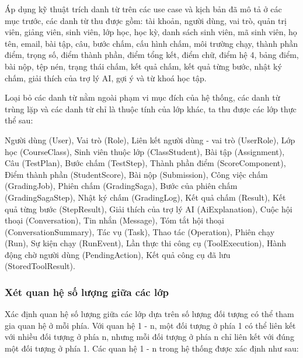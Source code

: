 \documentclass[../BTL.tex]{subfiles}
\begin{document}
Áp dụng kỹ thuật trích danh từ trên các use case và kịch bản đã mô tả ở các mục trước, các danh từ thu được gồm: tài khoản, người dùng, vai trò, quản trị viên, giảng viên, sinh viên, lớp học, học kỳ, danh sách sinh viên, mã sinh viên, họ tên, email, bài tập, câu, bước chấm, cấu hình chấm, môi trường chạy, thành phần điểm, trọng số, điểm thành phần, điểm tổng kết, điểm chữ, điểm hệ 4, bảng điểm, bài nộp, tệp nén, trạng thái chấm, kết quả chấm, kết quả từng bước, nhật ký chấm, giải thích của trợ lý AI, gợi ý và từ khoá học tập.

Loại bỏ các danh từ nằm ngoài phạm vi mục đích của hệ thống, các danh từ trùng lặp và các danh từ chỉ là thuộc tính của lớp khác, ta thu được các lớp thực thể sau:

Người dùng (User), Vai trò (Role), Liên kết người dùng - vai trò (UserRole), Lớp học (CourseClass), Sinh viên thuộc lớp (ClassStudent), Bài tập (Assignment), Câu (TestPlan), Bước chấm (TestStep), Thành phần điểm (ScoreComponent), Điểm thành phần (StudentScore), Bài nộp (Submission), Công việc chấm (GradingJob), Phiên chấm (GradingSaga), Bước của phiên chấm (GradingSagaStep), Nhật ký chấm (GradingLog), Kết quả chấm (Result), Kết quả từng bước (StepResult), Giải thích của trợ lý AI (AiExplanation), Cuộc hội thoại (Conversation), Tin nhắn (Message), Tóm tắt hội thoại (ConversationSummary), Tác vụ (Task), Thao tác (Operation), Phiên chạy (Run), Sự kiện chạy (RunEvent), Lần thực thi công cụ (ToolExecution), Hành động chờ người dùng (PendingAction), Kết quả công cụ đã lưu (StoredToolResult).


\subsubsection{Xét quan hệ số lượng giữa các lớp}

Xác định quan hệ số lượng giữa các lớp dựa trên số lượng đối tượng có thể tham gia quan hệ ở mỗi phía. Với quan hệ 1 - n, một đối tượng ở phía 1 có thể liên kết với nhiều đối tượng ở phía n, nhưng mỗi đối tượng ở phía n chỉ liên kết với đúng một đối tượng ở phía 1. Các quan hệ 1 - n trong hệ thống được xác định như sau:
\end{document}
